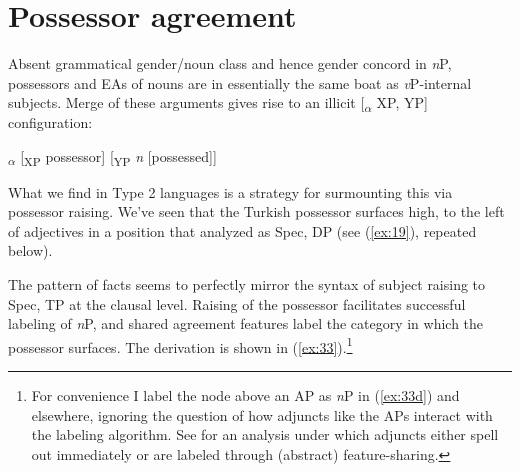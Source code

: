 \documentclass[output=paper
,modfonts
,nonflat]{langsci/langscibook}
\begin{document}
\section{Possessor agreement} \label{sec:4}
Absent grammatical gender/noun class and hence gender concord in \textit{n}P, possessors and EAs of nouns are in essentially the same boat as \textit{v}P-internal subjects. Merge of these arguments gives rise to an illicit [\textsubscript{${\alpha}$} XP, YP] configuration:

\begin{exe}
\ex *{\lbrack}\textsubscript{$\alpha$} [\textsubscript{XP} possessor] [\textsubscript{YP} \textit{n} [possessed]]{\rbrack}
\end{exe}
What we find in Type 2 languages is a strategy for surmounting this via possessor raising. We’ve seen that the Turkish possessor surfaces high, to the left of adjectives in a position that \citet{Abney1987} analyzed as Spec, DP (see (\ref{ex:19}), repeated below).

\begin{figure}[!h]
	\begin{exe}
	\end{exe}
\end{figure}
\newpage \noindent
The pattern of facts seems to perfectly mirror the syntax of subject raising to Spec, TP at the clausal level. Raising of the possessor facilitates successful labeling of \textit{n}P, and shared agreement features label the category in which the possessor surfaces. The derivation is shown in (\ref{ex:33}).\footnote{For convenience I label the node above an AP as \textit{n}P in (\ref{ex:33d}) and elsewhere, ignoring the question of how adjuncts like the APs interact with the labeling algorithm. See \citet{Oseki2014} for an analysis under which adjuncts either spell out immediately or are labeled through (abstract) feature-sharing.}
\end{document}
